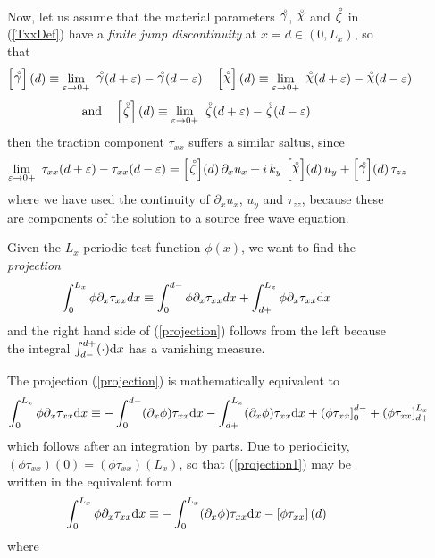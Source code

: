 \begin{figure}
{\begin{minipage} {145.0mm}
Now, let us assume  that the material parameters  ${\stackrel{\scriptscriptstyle _{\,\,\circ}}{ \gamma}}$, ${\stackrel{\scriptscriptstyle _{\,\,\circ}}{ \chi}}$ and ${\stackrel{\scriptscriptstyle _{\,\,\circ}}{ \zeta}}$  in 
(\ref{TxxDef}) 
have a {\em finite jump discontinuity\/} at $x=d\in(0,L_x)$, so that
\[
\left[{ {\stackrel{\scriptscriptstyle _{\,\,\circ}}{ \gamma}} }\right](d) \equiv   \lim\limits_{ 
\varepsilon    \rightarrow   0+}\  {\stackrel{\scriptscriptstyle _{\,\,\circ}}{ \gamma}}   (d+ 
\varepsilon   )- {\stackrel{\scriptscriptstyle _{\,\,\circ}}{ \gamma}}   (d- \varepsilon)\quad 
 \left[{ {\stackrel{\scriptscriptstyle _{\,\,\circ}}{ \chi}} }\right](d) \equiv   \lim\limits_{ 
\varepsilon    \rightarrow   0+}\  {\stackrel{\scriptscriptstyle _{\,\,\circ}}{ \chi}}   (d+ 
\varepsilon   )- {\stackrel{\scriptscriptstyle _{\,\,\circ}}{ \chi}}   (d- \varepsilon)\]
\[
\mbox{and}\quad
\left[{ {\stackrel{\scriptscriptstyle _{\,\,\circ}}{ \zeta}} }\right](d) \equiv   \lim\limits_{ 
\varepsilon    \rightarrow   0+}\  {\stackrel{\scriptscriptstyle _{\,\,\circ}}{ \zeta}}   (d+ 
\varepsilon   )- {\stackrel{\scriptscriptstyle _{\,\,\circ}}{ \zeta}}   (d- \varepsilon)
\] 
then the traction component ${\tau }_{xx}$ suffers a similar saltus, since
\[
\lim\limits_{ 
\varepsilon    \rightarrow   0+}\  {\tau }_{xx}   (d+ 
\varepsilon   )- {\tau }_{xx}   (d- \varepsilon)=
\left[{ {\stackrel{\scriptscriptstyle _{\,\,\circ}}{ \zeta}} }\right]\!(d)\,{\partial }_{ x}{ u}_{ x}
+i\, k_y\,\left[{ {\stackrel{\scriptscriptstyle _{\,\,\circ}}{ \chi}} }\right]\!(d)\,{ u}_{ y}
+\left[{ {\stackrel{\scriptscriptstyle _{\,\,\circ}}{ \gamma}} }\right]\!(d)\, {\tau }_{zz}
\]
where we have used the continuity of $\partial_x{ u}_{ x}$, ${ u}_{y}$  
and ${\tau }_{zz}$, because 
these are components of the solution to a source free wave equation.

Given the $L_x$-periodic test function $\phi(x)$, we want to find the {\em 
projection\/}
\begin{equation} \label{projection}
\int_{0}^{L_x} \phi \partial_{x}{\tau }_{xx} { d}x\equiv\int_{0}^{d-} \phi \partial_{x}{\tau }_{xx} 
{ d}x+\int_{d+}^{L_x} \phi \partial_{x} {\tau }_{xx} {\rm d}x
\end{equation} 
and the right hand side of (\ref{projection}) follows from the left because 
the integral $\int_{d-}^{d+} (\cdot) {\rm d}x$ has a 
vanishing measure.


The projection (\ref{projection}) is mathematically equivalent to
\begin{equation} \label{projection1}
\int_{0}^{L_x} \phi \partial_{x}{\tau }_{xx} {\rm d}x\equiv -\int_{0}^{d-} 
(\partial_{x}\phi) {\tau }_{xx} 
{\rm d}x-\int_{d+}^{L_x} (\partial_{x}\phi)  {\tau }_{xx} {\rm d}x
+\left( \phi {\tau }_{xx}\right]_{0}^{d-}+\left( \phi {\tau 
}_{xx}\right]_{d+}^{L_x}
\end{equation} 
which follows after an integration by parts. Due to periodicity, 
$(\phi  {\tau }_{xx})(0)=(\phi  {\tau 
}_{xx})(L_x)$, so that (\ref{projection1}) may be written in the equivalent 
form
\begin{equation} \label{projection2}
\int_{0}^{L_x} \phi \partial_{x}{\tau }_{xx} {\rm d}x\equiv -\int_{0}^{L_x} 
(\partial_{x}\phi) {\tau }_{xx} 
{\rm d}x -\left[ \phi {\tau }_{xx}\right](d)
\end{equation} 
where

\vspace{3mm}
\end{minipage}
}
\end{figure}
